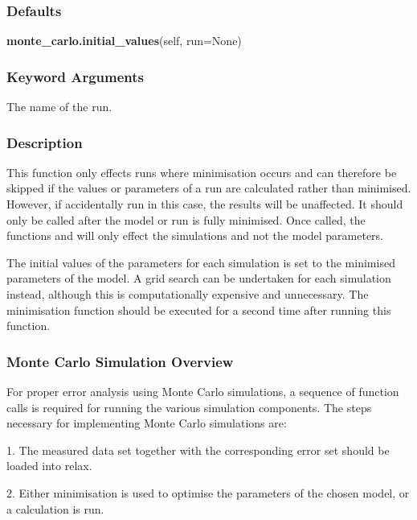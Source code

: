 \subsubsection{Defaults}

\textsf{\textbf{monte\_carlo.initial\_values}(self, run=None)}


\subsubsection{Keyword Arguments}

  The name of the run. 




\subsubsection{Description}

This function only effects runs where minimisation occurs and can therefore be skipped if the values or parameters of a run are calculated rather than minimised.  However, if accidentally run in this case, the results will be unaffected.  It should only be called after the model or run is fully minimised.  Once called, the functions  and  will only effect the simulations and not the model parameters.


The initial values of the parameters for each simulation is set to the minimised parameters of the model.  A grid search can be undertaken for each simulation instead, although this is computationally expensive and unnecessary.  The minimisation function should be executed for a second time after running this function.



\subsubsection{Monte Carlo Simulation Overview}

For proper error analysis using Monte Carlo simulations, a sequence of function calls is required for running the various simulation components.  The steps necessary for implementing Monte Carlo simulations are:


1.  The measured data set together with the corresponding error set should be loaded into relax.


2.  Either minimisation is used to optimise the parameters of the chosen model, or a calculation is run.


